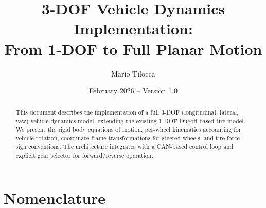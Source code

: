 \documentclass[11pt,a4paper]{article}
\title{3-DOF Vehicle Dynamics Implementation:\\
From 1-DOF to Full Planar Motion}
\author{Mario Tilocca}
\date{February 2026 -- Version 1.0}
\begin{document}
\maketitle

\begin{abstract}
This document describes the implementation of a full 3-DOF (longitudinal, lateral, yaw) vehicle dynamics model, extending the existing 1-DOF Dugoff-based tire model. We present the rigid body equations of motion, per-wheel kinematics accounting for vehicle rotation, coordinate frame transformations for steered wheels, and tire force sign conventions. The architecture integrates with a CAN-based control loop and explicit gear selector for forward/reverse operation.
\end{abstract}

\tableofcontents
\clearpage

\section*{Nomenclature}
\end{document}
